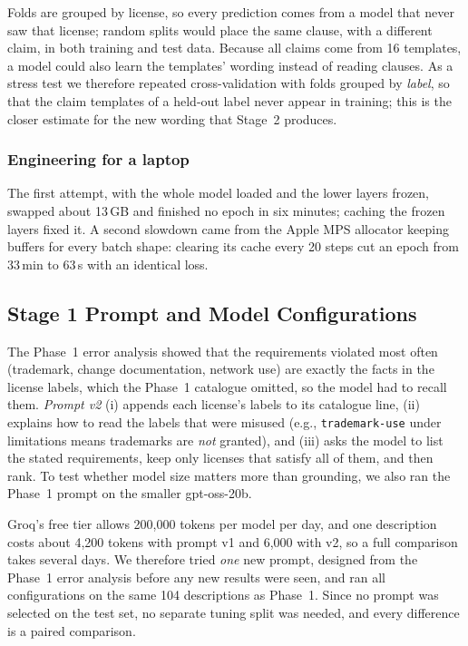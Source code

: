 Folds are grouped by license, so every prediction comes from a model that never saw that license; random splits would place the same clause, with a different claim, in both training and test data. Because all claims come from 16 templates, a model could also learn the templates' wording instead of reading clauses. As a stress test we therefore repeated cross-validation with folds grouped by \emph{label}, so that the claim templates of a held-out label never appear in training; this is the closer estimate for the new wording that Stage~2 produces.

\subsubsection{Engineering for a laptop}
The first attempt, with the whole model loaded and the lower layers frozen, swapped about 13\,GB and finished no epoch in six minutes; caching the frozen layers fixed it. A second slowdown came from the Apple MPS allocator keeping buffers for every batch shape: clearing its cache every 20 steps cut an epoch from 33\,min to 63\,s with an identical loss.

\subsection{Stage 1 Prompt and Model Configurations}
\label{ss:stage1method}

The Phase~1 error analysis showed that the requirements violated most often (trademark, change documentation, network use) are exactly the facts in the license labels, which the Phase~1 catalogue omitted, so the model had to recall them. \emph{Prompt v2} (i) appends each license's labels to its catalogue line, (ii) explains how to read the labels that were misused (e.g., \texttt{trademark-use} under limitations means trademarks are \emph{not} granted), and (iii) asks the model to list the stated requirements, keep only licenses that satisfy all of them, and then rank. To test whether model size matters more than grounding, we also ran the Phase~1 prompt on the smaller gpt-oss-20b.

Groq's free tier allows 200{,}000 tokens per model per day, and one description costs about 4{,}200 tokens with prompt v1 and 6{,}000 with v2, so a full comparison takes several days. We therefore tried \emph{one} new prompt, designed from the Phase~1 error analysis before any new results were seen, and ran all configurations on the same 104 descriptions as Phase~1. Since no prompt was selected on the test set, no separate tuning split was needed, and every difference is a paired comparison.
